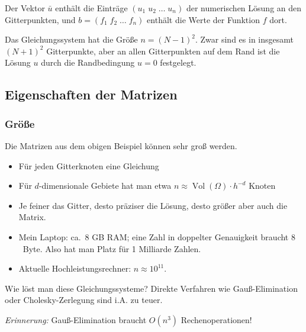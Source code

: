 \medskip

Der Vektor $\bar{u}$ enthält die Einträge $(u_1 \; u_2 \;\dots\; u_n)$ der numerischen Lösung
an den Gitterpunkten, und $b = (f_1 \; f_2 \;\dots\; f_n)$ enthält die Werte der
Funktion $f$ dort.

\medskip

Das Gleichungssystem hat die Größe $n = (N-1)^2$.  Zwar sind es in insgesamt $(N+1)^2$
Gitterpunkte, aber an allen Gitterpunkten auf dem Rand ist die Lösung $u$ durch die
Randbedingung $u = 0$ festgelegt.


\subsection{Eigenschaften der Matrizen}
\subsubsection{Größe}
Die Matrizen aus dem obigen Beispiel können sehr groß werden.
\begin{itemize}
	\item Für jeden Gitterknoten eine Gleichung
	\item Für $d$-dimensionale Gebiete hat man etwa $n \approx \operatorname{Vol}( \Omega ) \cdot h^{-d}$ Knoten
	\item Je feiner das Gitter, desto präziser die Lösung, desto größer aber auch die Matrix.
	\item Mein Laptop: ca.\ 8 GB RAM; eine Zahl in doppelter Genauigkeit braucht $8$~Byte.
	  Also hat man Platz für 1 Milliarde Zahlen.
	\item Aktuelle Hochleistungsrechner: $n \approx 10^{11}$.
\end{itemize}

Wie löst man diese Gleichungssysteme? Direkte Verfahren wie Gauß-Elimination oder Cholesky-Zerlegung sind i.A. zu teuer.

\emph{Erinnerung:} Gauß-Elimination braucht $O(n^3)$ Rechenoperationen!

